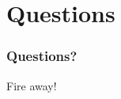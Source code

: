 \documentclass[handout,10pt]{beamer}
\begin{document}
\section{Questions}
\begin{frame}
	\frametitle{Questions?}
	\begin{center}
		Fire away!
	\end{center}
\end{frame}

\end{document}
